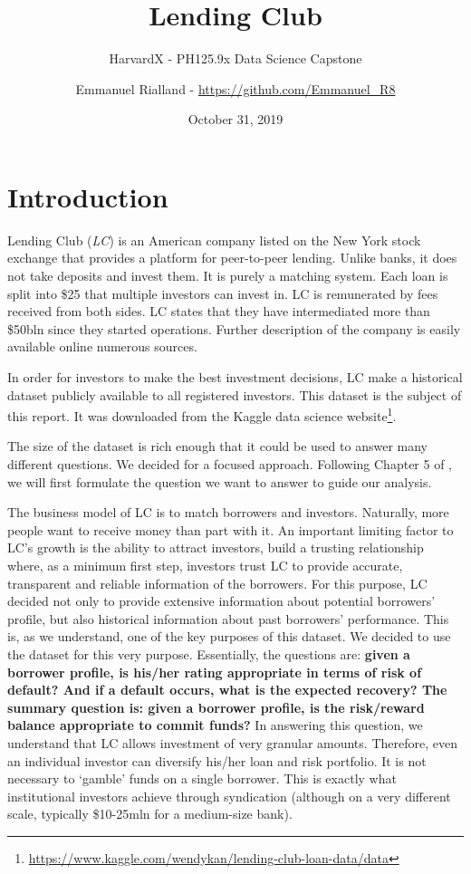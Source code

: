 \documentclass[11pt,]{report}
\title{Lending Club}
\subtitle{HarvardX - PH125.9x Data Science Capstone}
\author{Emmanuel Rialland - \url{https://github.com/Emmanuel_R8}}
\date{October 31, 2019}
\let\rmarkdownfootnote\footnote%
\def\footnote{\protect\rmarkdownfootnote}
\begin{document}
\maketitle

{
\hypersetup{linkcolor=black}
\setcounter{tocdepth}{2}
\tableofcontents
}
\listoftables
\listoffigures
\small

\normalsize

\hypertarget{introduction}{%
\chapter*{Introduction}\label{introduction}}

Lending Club (\emph{LC}) is an American company listed on the New York stock exchange that provides a platform for peer-to-peer lending. Unlike banks, it does not take deposits and invest them. It is purely a matching system. Each loan is split into \$25 that multiple investors can invest in. LC is remunerated by fees received from both sides. LC states that they have intermediated more than \$50bln since they started operations. Further description of the company is easily available online numerous sources.

In order for investors to make the best investment decisions, LC make a historical dataset publicly available to all registered investors. This dataset is the subject of this report. It was downloaded from the Kaggle data science website\footnote{\url{https://www.kaggle.com/wendykan/lending-club-loan-data/data}}.

The size of the dataset is rich enough that it could be used to answer many different questions. We decided for a focused approach. Following Chapter 5 of \citet{peng2012exploratory}, we will first formulate the question we want to answer to guide our analysis.

The business model of LC is to match borrowers and investors. Naturally, more people want to receive money than part with it. An important limiting factor to LC's growth is the ability to attract investors, build a trusting relationship where, as a minimum first step, investors trust LC to provide accurate, transparent and reliable information of the borrowers. For this purpose, LC decided not only to provide extensive information about potential borrowers' profile, but also historical information about past borrowers' performance. This is, as we understand, one of the key purposes of this dataset. We decided to use the dataset for this very purpose. Essentially, the questions are: \textbf{given a borrower profile, is his/her rating appropriate in terms of risk of default? And if a default occurs, what is the expected recovery? The summary question is: given a borrower profile, is the risk/reward balance appropriate to commit funds?} In answering this question, we understand that LC allows investment of very granular amounts. Therefore, even an individual investor can diversify his/her loan and risk portfolio. It is not necessary to `gamble' funds on a single borrower. This is exactly what institutional investors achieve through syndication (although on a very different scale, typically \$10-25mln for a medium-size bank).
\end{document}
